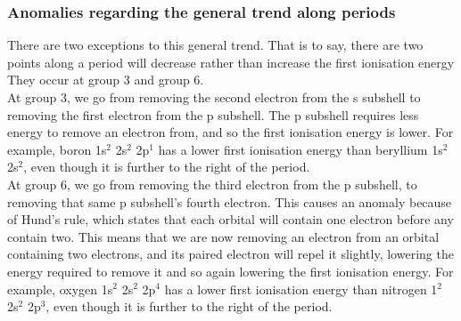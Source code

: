 \subsubsection{Anomalies regarding the general trend along periods}
There are two exceptions to this general trend. That is to say, there are two points along a period will decrease rather than increase the first ionisation energy They occur at group 3 and group 6.
\\
At group 3, we go from removing the second electron from the s subshell to removing the first electron from the p subshell. The p subshell requires less energy to remove an electron from, and so the first ionisation energy is lower. For example, boron 1s$^2$ 2s$^2$ 2p$^1$ has a lower first ionisation energy than beryllium 1s$^2$ 2s$^2$, even though it is further to the right of the period.
\\
At group 6, we go from removing the third electron from the p subshell, to removing that same p subshell's fourth electron. This causes an anomaly because of Hund's rule, which states that each orbital will contain one electron before any contain two. This means that we are now removing an electron from an orbital containing two electrons, and its paired electron will repel it slightly, lowering the energy required to remove it and so again lowering the first ionisation energy. For example, oxygen 1s$^2$ 2s$^2$ 2p$^4$ has a lower first ionisation energy than nitrogen 1$^2$ 2s$^2$ 2p$^3$, even though it is further to the right of the period.
